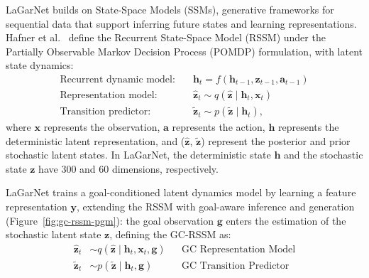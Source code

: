 \documentclass[journal]{IEEEtran}
\newif\ifshowrev\showrevtrue
\newcommand{\rev}[1]{\ifshowrev\textcolor{revblue}{#1}\else#1\fi}
\newif\ifshowirev\showirevtrue
\newcommand{\irev}[1]{\ifshowirev\textcolor{irevgreen}{#1}\else#1\fi}
\newif\ifshowrrev\showrrevtrue
\newcommand{\rrev}[1]{\ifshowrrev\textcolor{rrevred}{#1}\else#1\fi}
\begin{document}
\rev{LaGarNet builds on State-Space Models (SSMs), generative frameworks for sequential data that support inferring future states and learning representations. Hafner et al.~\cite{hafner2019learning} define the Recurrent State-Space Model (RSSM) under the Partially Observable Markov Decision Process (POMDP) formulation, with latent state dynamics:}
\begin{equation}
\begin{aligned}
    \text{Recurrent dynamic model:} & \quad \bm{h}_t=f(\bm{h}_{t-1},\bm{z}_{t-1},\bm{a}_{t-1}) \\
    \text{Representation model:}    & \quad \hat{\bm{z}}_t\sim q(\hat{\bm{z}}\;|\;\bm{h}_t,\bm{x}_t) \\
    \text{Transition predictor:}    & \quad \tilde{\bm{z}}_t\sim p(\tilde{\bm{z}}\;|\;\bm{h}_{t}),
\end{aligned}
\end{equation}
where $\bm{x}$ represents the observation, $\bm{a}$ represents the action, $\bm{h}$ represents the deterministic latent representation, and ($\hat{\bm{z}}$, $\tilde{\bm{z}}$) represent the posterior and prior stochastic latent states. \rev{\rrev{In LaGarNet, the deterministic state $\bm{h}$ and the stochastic state $\bm{z}$ have 300 and 60 dimensions, respectively.}}

\rev{LaGarNet trains a goal-conditioned latent dynamics model by learning a feature representation $\bm{y}$, extending the RSSM with goal-aware inference and generation (Figure~\ref{fig:gc-rssm-pgm}): the goal observation $\bm{g}$ enters the estimation of the stochastic latent state $\bm{z}$, \irev{defining} the GC-RSSM as:}
\begin{align}
    \hat{\bm{z}}_t &\sim q(\hat{\bm{z}} \;|\; \bm{h}_t, \bm{x}_t, \bm{g}) 
    && \text{GC Representation Model} \label{eq:gc-repr} \\
    \tilde{\bm{z}}_t &\sim p(\tilde{\bm{z}} \;|\; \bm{h}_t, \bm{g}) 
    && \text{GC Transition Predictor} \label{eq:gc-trans}
\end{align}
\end{document}
